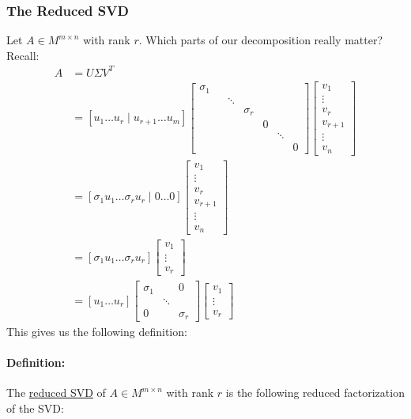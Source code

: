 \documentclass{article}
\begin{document}
\subsubsection{The Reduced SVD}
Let $A\in M^{m\times n}$ with rank $r$. Which parts of our decomposition really matter? Recall:
\begin{align*}
    A&=U\Sigma V^T\\
    &=[ u_1 \dots u_r \mid u_{r+1} \dots u_m]\begin{bmatrix}\sigma_1 \\&&\ddots\\&&&\sigma_r\\&&&&0\\&&&&&\ddots\\&&&&&&0\end{bmatrix}\begin{bmatrix}v_1\\\vdots \\ v_r \\\hline v_{r+1}\\\vdots \\ v_n\end{bmatrix} \\
    &=[ \sigma_1u_1 \dots \sigma_ru_r \mid 0 \dots 0]\begin{bmatrix}v_1\\\vdots \\ v_r \\\hline v_{r+1}\\\vdots \\ v_n\end{bmatrix}\\
    &=[ \sigma_1u_1 \dots \sigma_ru_r]\begin{bmatrix}v_1\\\vdots \\ v_r\end{bmatrix}\\
    &= [ u_1 \dots u_r]\begin{bmatrix}\sigma_1&&0 \\&\ddots\\0&&\sigma_r\end{bmatrix}\begin{bmatrix}v_1\\\vdots \\ v_r\end{bmatrix}
\end{align*}
This gives us the following definition:
\bigskip

\paragraph{Definition:} The \underline{reduced SVD} of $A\in M^{m\times n}$ with rank $r$ is the following reduced factorization of the SVD:
\end{document}
